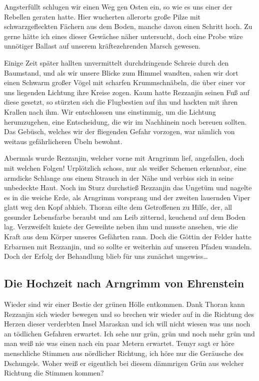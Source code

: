Angsterfüllt schlugen wir einen Weg gen Osten ein, so wie es uns einer der Rebellen geraten hatte. Hier wucherten allerorts große Pilze mit schwarzgefleckten Fächern aus dem Boden, manche davon einen Schritt hoch. Zu gerne hätte ich eines dieser Gewächse näher untersucht, doch eine Probe wäre unnötiger Ballast auf unserem kräftezehrenden Marsch gewesen. 

Einige Zeit später hallten unvermittelt durchdringende Schreie durch den Baumstand, und als wir unsere Blicke zum Himmel wandten, sahen wir dort einen Schwarm großer Vögel mit scharfen Krummschnäbeln, die über einer vor uns liegenden Lichtung ihre Kreise zogen. Kaum hatte Rezzanjin seinen Fuß auf diese gesetzt, so stürzten sich die Flugbestien auf ihn und hackten mit ihren Krallen nach ihm. Wir entschlossen uns einstimmig, um die Lichtung herumzugehen, eine Entscheidung, die wir im Nachhinein noch bereuen sollten. Das Gebüsch, welches wir der fliegenden Gefahr vorzogen, war nämlich von weitaus gefährlicheren Übeln bewohnt. 

Abermals wurde Rezzanjin, welcher vorne mit Arngrimm lief, angefallen, doch mit welchen Folgen! Urplötzlich schoss, nur als weißer Schemen erkennbar, eine armdicke Schlange aus einem Strauch in der Nähe und verbiss sich in seine unbedeckte Haut. Noch im Sturz durchstieß Rezzanjin das Ungetüm und nagelte es in die weiche Erde, als Arngrimm vorsprang und der zweiten lauernden Viper glatt weg den Kopf abhieb. Thoran eilte dem Getroffenen zu Hilfe, der, all gesunder Lebensfarbe beraubt und am Leib zitternd, keuchend auf dem Boden lag. Verzweifelt kniete der Geweihte neben ihm und musste ansehen, wie die Kraft aus dem Körper unseres Gefährten rann. Doch die Göttin der Felder hatte Erbarmen mit Rezzanjin, und so sollte er weiterhin auf unseren Pfaden wandeln. Doch der Erfolg der Behandlung blieb für uns zunächst ungewiss\dots

\subsection{Die Hochzeit nach Arngrimm von Ehrenstein}

Wieder sind wir einer Bestie der grünen Hölle entkommen. Dank Thoran kann Rezzanjin sich wieder bewegen und so brechen wir wieder auf in die Richtung des Herzen dieser verderbten Insel Maraskan und ich will nicht wiesen was uns noch an tödlichen Gefahren erwartet. Ich sehe nur grün, grün und noch mehr grün und man weiß nie was einen nach ein paar Metern erwartet. 
Temyr sagt er höre menschliche Stimmen aus nördlicher Richtung, ich höre nur die Geräusche des Dschungels. Woher weiß er eigentlich bei diesem dämmrigen Grün aus welcher Richtung die Stimmen kommen?


